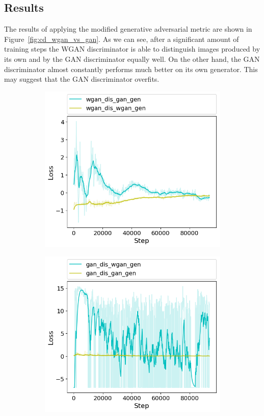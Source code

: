 \subsection{Results}
The results of applying the modified generative adversarial metric are shown in Figure~\ref{fig:cd_wgan_vs_gan}. As we can see, after a significant amount of training steps the WGAN discriminator is able to distinguish images produced by its own and by the GAN discriminator equally well. On the other hand, the GAN discriminator almost constantly performs much better on its own generator. This may suggest that the GAN discriminator overfits. 
\begin{figure}[h!]
	\begin{subfigure}[b]{0.5\textwidth}
		\includegraphics[width=\textwidth]{figures/cross_dis/trial16_wgan_dis_gan_gen}
	\end{subfigure}
	\begin{subfigure}[b]{0.5\textwidth}
		\includegraphics[width=\textwidth]{figures/cross_dis/trial16_gan_dis_wgan_gen}

\end{subfigure}
\end{figure}
